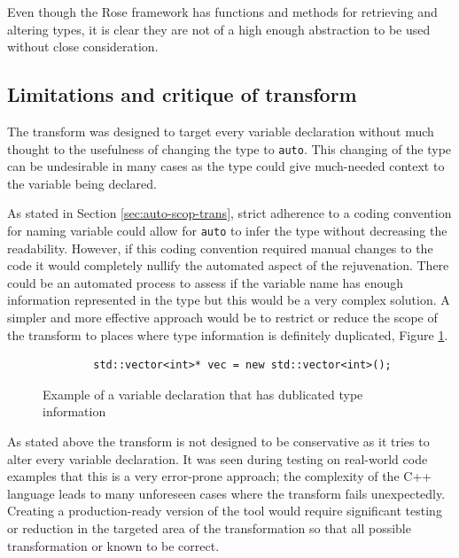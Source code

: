 \documentclass[bsc,frontabs,singlespacing,twoside,parskip,deptreport]{infthesis}
\begin{document}
Even though the Rose framework has functions and methods for retrieving and altering types, it is clear they are not of a high enough abstraction to be used without close consideration.

\subsection{Limitations and critique of transform} 


The transform was designed to target every variable declaration without much thought to the usefulness of changing the type to \texttt{auto}. This changing of the type can be undesirable in many cases as the type could give much-needed context to the variable being declared. 

As stated in Section \ref{sec:auto-scop-trans}, strict adherence to a coding convention for naming variable could allow for \texttt{auto} to infer the type without decreasing the readability. However, if this coding convention required manual changes to the code it would completely nullify the automated aspect of the rejuvenation. There could be an automated process to assess if the variable name has enough information represented in the type but this would be a very complex solution. A simpler and more effective approach would be to restrict or reduce the scope of the transform to places where type information is definitely duplicated, Figure \ref{fig:example-dup-typ-info}.

\begin{figure}
    \centering
    \begin{verbatim}
        std::vector<int>* vec = new std::vector<int>(); 
    \end{verbatim}
    \caption{Example of a variable declaration that has dublicated type information}
    \label{fig:example-dup-typ-info}
\end{figure}


As stated above the transform is not designed to be conservative as it tries to alter every variable declaration. It was seen during testing on real-world code examples that this is a very error-prone approach; the complexity of the C++ language leads to many unforeseen cases where the transform fails unexpectedly. Creating a production-ready version of the tool would require significant testing or reduction in the targeted area of the transformation so that all possible transformation or known to be correct. 
\end{document}
